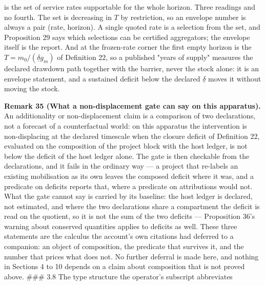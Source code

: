 \documentclass[11pt]{article}
\begin{document}
 is the set of service rates supportable for the whole horizon. Three readings and no fourth. The set is decreasing in \(T\) by restriction, so an envelope number is always a pair (rate, horizon). A single quoted rate is a selection from the set, and Proposition 29 says which selections can be certified aggregators; the envelope itself is the report. And at the frozen-rate corner the first empty horizon is the \(T =\allowbreak{} m_0/(\underline\delta g_m)\) of Definition 22, so a published "years of supply" measures the declared drawdown path together with the barrier, never the stock alone: it is an envelope statement, and a sustained deficit below the declared \(\underline\delta\) moves it without moving the stock.

\textbf{Remark 35 (What a non-displacement gate can say on this apparatus).} An additionality or non-displacement claim is a comparison of two declarations, not a forecast of a counterfactual world: on this apparatus the intervention is non-displacing at the declared timescale when the closure deficit of Definition 22, evaluated on the composition of the project block with the host ledger, is not below the deficit of the host ledger alone. The gate is then checkable from the declarations, and it fails in the ordinary way --- a project that re-labels an existing mobilisation as its own leaves the composed deficit where it was, and a predicate on deficits reports that, where a predicate on attributions would not. What the gate cannot say is carried by its baseline: the host ledger is declared, not estimated, and where the two declarations share a compartment the deficit is read on the quotient, so it is not the sum of the two deficits --- Proposition 36's warning about conserved quantities applies to deficits as well. These three statements are the calculus the account's own citations had deferred to a companion: an object of composition, the predicate that survives it, and the number that prices what does not. No further deferral is made here, and nothing in Sections 4 to 10 depends on a claim about composition that is not proved above. \#\#\# 3.8 The type structure the operator's subscript abbreviates
\end{document}
